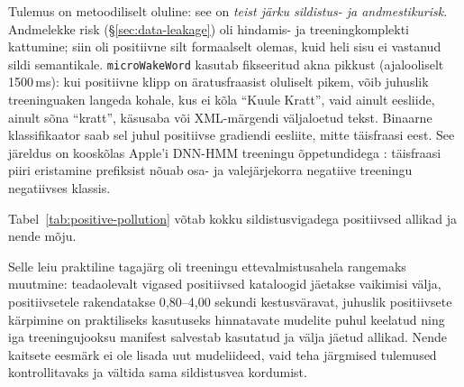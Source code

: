 Tulemus on metoodiliselt oluline: see on \emph{teist järku sildistus- ja andmestikurisk}. Andmelekke risk (§\ref{sec:data-leakage}) oli hindamis- ja treeningkomplekti kattumine; siin oli positiivne silt formaalselt olemas, kuid heli sisu ei vastanud sildi semantikale. \texttt{microWakeWord} kasutab fikseeritud akna pikkust (ajalooliselt 1500\,ms): kui positiivne klipp on äratusfraasist oluliselt pikem, võib juhuslik treeninguaken langeda kohale, kus ei kõla \enquote{Kuule Kratt}, vaid ainult eesliide, ainult sõna \enquote{kratt}, käsusaba või XML-märgendi väljaloetud tekst. Binaarne klassifikaator saab sel juhul positiivse gradiendi eesliite, mitte täisfraasi eest. See järeldus on kooskõlas Apple'i DNN-HMM treeningu õppetundidega \cite{shrivastava2021optimize}: täisfraasi piiri eristamine prefiksist nõuab osa- ja valejärjekorra negatiive treeningu negatiivses klassis.

Tabel~\ref{tab:positive-pollution} võtab kokku sildistusvigadega positiivsed allikad ja nende mõju.

\begin{table}[H]
\centering
\caption{V17 treeningus kasutatud sildistusvigadega positiivsed allikad. \enquote{Mediaan} ja \enquote{max} viitavad klipipikkusele sekundites. Kõik allikad on praktiliseks kasutuseks hinnatavate mudelite treeningust karantiini pandud kataloogi \texttt{\_quarantine\_duplicates/} alla.}
\label{tab:positive-pollution}
\small
{}
\end{table}

Selle leiu praktiline tagajärg oli treeningu ettevalmistusahela rangemaks muutmine: teadaolevalt vigased positiivsed kataloogid jäetakse vaikimisi välja, positiivsetele rakendatakse 0{,}80--4{,}00 sekundi kestusväravat, juhuslik positiivsete kärpimine on praktiliseks kasutuseks hinnatavate mudelite puhul keelatud ning iga treeningujooksu manifest salvestab kasutatud ja välja jäetud allikad. Nende kaitsete eesmärk ei ole lisada uut mudeliideed, vaid teha järgmised tulemused kontrollitavaks ja vältida sama sildistusvea kordumist.

